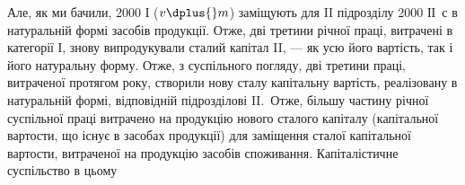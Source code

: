 Але, як ми бачили, 2000 І ($v \dplus{} m$) заміщують для II підрозділу 2000
ІІ~$с$ в натуральній формі засобів продукції. Отже, дві третини річної
праці, витрачені в категорії І, знову випродукували сталий капітал II, —
як усю його вартість, так і його натуральну форму. Отже, з суспільного
погляду, дві третини праці, витраченої протягом року, створили нову сталу
капітальну вартість, реалізовану в натуральній формі, відповідній підрозділові
II.~Отже, більшу частину річної суспільної праці витрачено на
продукцію нового сталого капіталу (капітальної вартости, що існує в
засобах продукції) для заміщення сталої капітальної вартости, витраченої
на продукцію засобів споживання. Капіталістичне суспільство в цьому
\parbreak{}  %
